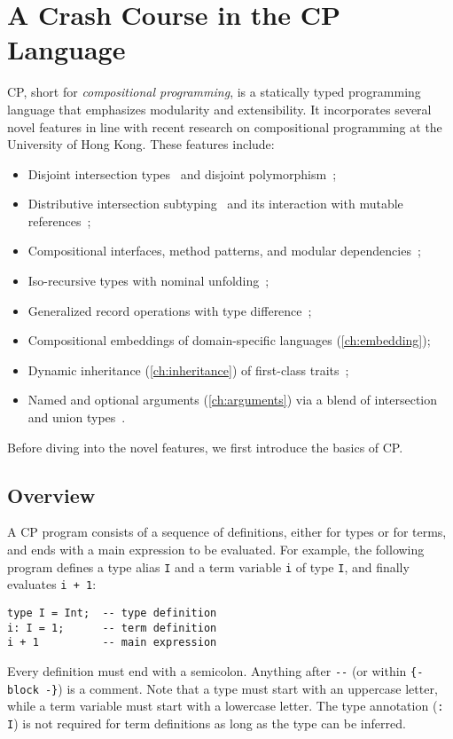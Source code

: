 \chapter{A Crash Course in the CP Language} \label{ch:cp}

CP, short for \emph{compositional programming}, is a statically typed
programming language that emphasizes modularity and extensibility. It
incorporates several novel features in line with recent research on
compositional programming at the University of Hong Kong. These features
include:
\begin{itemize}
\item Disjoint intersection types~\citep{oliveira2016disjoint} and disjoint
      polymorphism~\citep{alpuim2017disjoint,xie2020row};
\item Distributive intersection subtyping~\citep{bi2018essence,bi2019distributive}
      and its interaction with mutable references~\citep{ye2024imperative};
\item Compositional interfaces, method patterns, and modular
      dependencies~\citep{zhang2021compositional};
\item Iso-recursive types with nominal unfolding~\citep{zhou2022calculus};
\item Generalized record operations with type difference~\citep{xu2023making};
\item Compositional embeddings of domain-specific languages
      (\autoref{ch:embedding});
\item Dynamic inheritance (\autoref{ch:inheritance}) of first-class
      traits~\citep{bi2018typed};
\item Named and optional arguments (\autoref{ch:arguments}) via a blend of
      intersection and union types~\citep{rehman2023blend}.
\end{itemize}
Before diving into the novel features, we first introduce the basics of CP.

\section{Overview}

A CP program consists of a sequence of definitions, either for types or for
terms, and ends with a main expression to be evaluated. For example, the
following program defines a type alias \lstinline{I} and a term variable
\lstinline{i} of type \lstinline{I}, and finally evaluates \lstinline{i + 1}:
\begin{lstlisting}[xleftmargin=.3\textwidth]
type I = Int;  -- type definition
i: I = 1;      -- term definition
i + 1          -- main expression
\end{lstlisting}
Every definition must end with a semicolon.
Anything after \lstinline{--} (or within \lstinline|{- block -}|) is a comment.
Note that a type must start with an uppercase letter, while a term variable must
start with a lowercase letter. The type annotation (\lstinline{: I}) is not
required for term definitions as long as the type can be inferred.

